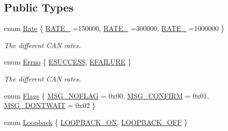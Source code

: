 \subsection*{Public Types}
\begin{DoxyCompactItemize}
\item 
enum \hyperlink{classosa_c_a_n_bus_ae977dbc0e1c16772395408c8e018fe6c}{Rate} \{ \hyperlink{classosa_c_a_n_bus_ae977dbc0e1c16772395408c8e018fe6caba07be3d817138593a2d9b20beb2fd7b}{R\-A\-T\-E\-\_} =150000, 
\hyperlink{classosa_c_a_n_bus_ae977dbc0e1c16772395408c8e018fe6cacfba6e26887df2910d93f4d2dcf70b3e}{R\-A\-T\-E\-\_} =300000, 
\hyperlink{classosa_c_a_n_bus_ae977dbc0e1c16772395408c8e018fe6ca17b91a8147de2124aca3198a0bfcb7b0}{R\-A\-T\-E\-\_} =1000000
 \}
\begin{DoxyCompactList}\small\item\em The different C\-A\-N rates. \end{DoxyCompactList}\item 
enum \hyperlink{classosa_c_a_n_bus_a6fa3e95ec4c36932d0640e40e0748fde}{Errno} \{ \hyperlink{classosa_c_a_n_bus_a6fa3e95ec4c36932d0640e40e0748fdeaef10d7d2c42027e99e8b6662a516adef}{E\-S\-U\-C\-C\-E\-S\-S}, 
\hyperlink{classosa_c_a_n_bus_a6fa3e95ec4c36932d0640e40e0748fdea2bd4b249945acf638e8d93c36b122150}{E\-F\-A\-I\-L\-U\-R\-E}
 \}
\begin{DoxyCompactList}\small\item\em The different C\-A\-N rates. \end{DoxyCompactList}\item 
enum \hyperlink{classosa_c_a_n_bus_a74fe35c6059237887431f3ccece7b21b}{Flags} \{ \hyperlink{classosa_c_a_n_bus_a74fe35c6059237887431f3ccece7b21ba30f701fa6e0dba6e274540941ccd3978}{M\-S\-G\-\_\-\-N\-O\-F\-L\-A\-G} = 0x00, 
\hyperlink{classosa_c_a_n_bus_a74fe35c6059237887431f3ccece7b21baf6e1a4ae7ca482b35052ce540ff572a9}{M\-S\-G\-\_\-\-C\-O\-N\-F\-I\-R\-M} = 0x01, 
\hyperlink{classosa_c_a_n_bus_a74fe35c6059237887431f3ccece7b21bae3b54980d3955fa497e0c19728dde774}{M\-S\-G\-\_\-\-D\-O\-N\-T\-W\-A\-I\-T} = 0x02
 \}
\item 
enum \hyperlink{classosa_c_a_n_bus_a992406c83a336e95fb4a09b0b13df786}{Loopback} \{ \hyperlink{classosa_c_a_n_bus_a992406c83a336e95fb4a09b0b13df786aea134020b1d03c7df95f141401e2cb0f}{L\-O\-O\-P\-B\-A\-C\-K\-\_\-\-O\-N}, 
\hyperlink{classosa_c_a_n_bus_a992406c83a336e95fb4a09b0b13df786ae2557509d0c1ac68029eeb6bdf6e703d}{L\-O\-O\-P\-B\-A\-C\-K\-\_\-\-O\-F\-F}
 \}
\end{DoxyCompactItemize}
